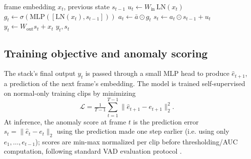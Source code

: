 \begin{algorithm}[t]
\caption{Streaming per-frame update (one layer)}
\label{alg:step}
\begin{algorithmic}[1]
\Require frame embedding $x_t$, previous state $s_{t-1}$
\State $u_t \gets W_{\text{in}} \, \mathrm{LN}(x_t)$
\State $g_t \gets \sigma(\mathrm{MLP}([\mathrm{LN}(x_t), s_{t-1}]))$
\State $a_t \gets \bar{a} \odot g_t$
\State $s_t \gets a_t \odot s_{t-1} + u_t$
\State $y_t \gets W_{\text{out}} s_t + x_t$
\State \Return $y_t, s_t$
\end{algorithmic}
\end{algorithm}

\subsection{Training objective and anomaly scoring}
\label{sec:method-score}
The stack's final output $y_t$ is passed through a small MLP head to
produce $\hat{e}_{t+1}$, a prediction of the next frame's embedding. The
model is trained self-supervised on normal-only training clips by
minimizing
\begin{equation}
  \mathcal{L} = \tfrac{1}{T-1}\textstyle\sum_{t=1}^{T-1} \lVert \hat{e}_{t+1} - e_{t+1} \rVert_2^2 .
\end{equation}
At inference, the anomaly score at frame $t$ is the prediction error
$s_t = \lVert \hat{e}_t - e_t \rVert_2$ using the prediction made one step
earlier (i.e. using only $e_1,\dots,e_{t-1}$); scores are min-max
normalized per clip before thresholding/AUC computation, following
standard VAD evaluation protocol \cite{liu2018future}.
